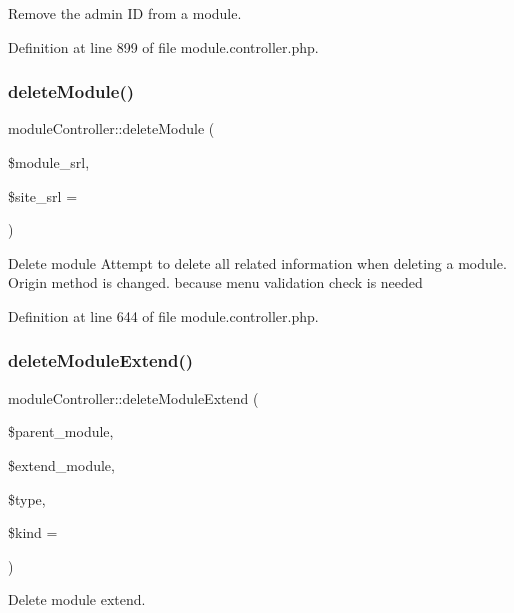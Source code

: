 Remove the admin ID from a module. 



Definition at line 899 of file module.\+controller.\+php.

\mbox{\label{classmoduleController_add52eeb3f4a3cb900376af8007c09655}} 
\subsubsection{\texorpdfstring{delete\+Module()}{deleteModule()}}
{\footnotesize\ttfamily module\+Controller\+::delete\+Module (\begin{DoxyParamCaption}\item[{}]{\$module\+\_\+srl,  }\item[{}]{\$site\+\_\+srl = {} }\end{DoxyParamCaption})}

Delete module Attempt to delete all related information when deleting a module. Origin method is changed. because menu validation check is needed 

Definition at line 644 of file module.\+controller.\+php.

\mbox{\label{classmoduleController_a74f94763f4e60fef8a0e4e4dabf777e0}} 
\subsubsection{\texorpdfstring{delete\+Module\+Extend()}{deleteModuleExtend()}}
{\footnotesize\ttfamily module\+Controller\+::delete\+Module\+Extend (\begin{DoxyParamCaption}\item[{}]{\$parent\+\_\+module,  }\item[{}]{\$extend\+\_\+module,  }\item[{}]{\$type,  }\item[{}]{\$kind = {\ttfamily \textquotesingle{}\textquotesingle{}} }\end{DoxyParamCaption})}



Delete module extend. 



